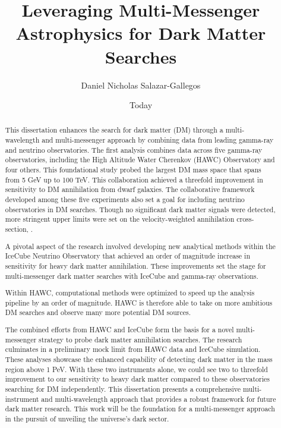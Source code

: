 \documentclass[PhD]{msu-thesis}
\title{Leveraging Multi-Messenger Astrophysics for Dark Matter Searches}
\author{Daniel Nicholas Salazar-Gallegos}
\date{Today}
\begin{document}
\frontmatter
\maketitlepage

\begin{abstract}

    This dissertation enhances the search for dark matter (DM) through a multi-wavelength and multi-messenger approach by combining data from leading gamma-ray and neutrino observatories.
    The first analysis combines data across five gamma-ray observatories, including the High Altitude Water Cherenkov (HAWC) Observatory and four others.
    This foundational study probed the largest DM mass space that spans from 5 GeV up to 100 TeV.
    This collaboration  achieved a threefold improvement in sensitivity to DM annihilation from dwarf galaxies.
    The collaborative framework developed among these five experiments also set a goal for including neutrino observatories in DM searches.
    Though no significant dark matter signals were detected, more stringent upper limits were set on the velocity-weighted annihilation cross-section, \sv.

    A pivotal aspect of the research involved developing new analytical methods within the IceCube Neutrino Observatory that achieved an order of magnitude increase in sensitivity for heavy dark matter annihilation.
    These improvements set the stage for multi-messenger dark matter searches with IceCube and gamma-ray observations.

    Within HAWC, computational methods were optimized to speed up the analysis pipeline by an order of magnitude.
    HAWC is therefore able to take on more ambitious DM searches and observe many more potential DM sources.

    The combined efforts from HAWC and IceCube form the basis for a novel multi-messenger strategy to probe dark matter annihilation searches.
    The research culminates in a preliminary mock limit from HAWC data and IceCube simulation.
    These analyses showcase the enhanced capability of detecting dark matter in the mass region above 1 PeV.
    With these two instruments alone, we could see two to threefold improvement to our sensitivity to heavy dark matter compared to these observatories searching for DM independently.
    This dissertation presents a comprehensive multi-instrument and multi-wavelength approach that provides a robust framework for future dark matter research.
    This work will be the foundation for a multi-messenger approach in the pursuit of unveiling the universe's dark sector.

\end{abstract}
\end{document}
